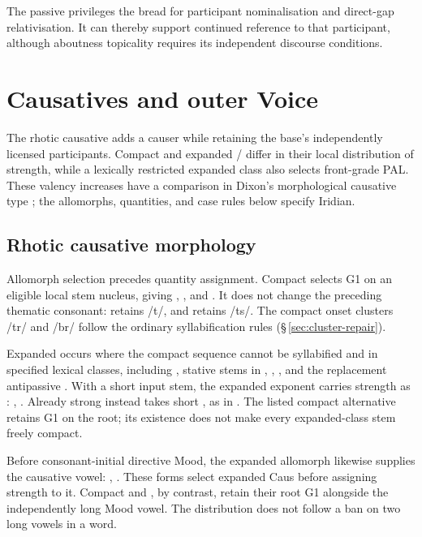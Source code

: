 The passive privileges the bread for
participant nominalisation and direct-gap relativisation. It can thereby
support continued reference to that participant, although aboutness topicality
requires its independent discourse conditions.


\section{Causatives and outer Voice}\label{sec:aspect-caus}

The rhotic causative adds a causer while retaining the base's independently
licensed participants. Compact  and expanded /
differ in their local distribution of strength, while a lexically restricted
expanded class also selects front-grade PAL. These valency increases have a
comparison in Dixon's morphological causative type \cite{dixon2000};
the allomorphs, quantities, and case rules below specify Iridian.

\subsection{Rhotic causative morphology}
\label{sec:causative-grades}

Allomorph selection precedes quantity assignment. Compact 
selects G1 on an eligible local stem nucleus, giving ,
, and . It does not change the preceding
thematic consonant:  retains /t/, and
 retains /ts/. The compact onset clusters /tr/ and /br/
follow the ordinary syllabification rules
(§\,\ref{sec:cluster-repair}).

Expanded  occurs where the compact sequence cannot be
syllabified and in specified lexical classes, including ,
stative stems in , , , and the
replacement antipassive . With a short input stem, the
expanded exponent carries strength as :
, . Already strong 
instead takes short , as in .
The listed compact alternative  retains G1 on the root;
its existence does not make every expanded-class stem freely compact.

Before consonant-initial directive Mood, the expanded allomorph likewise
supplies the causative vowel: , .
These forms select expanded Caus before assigning strength to it.
Compact  and , by contrast, retain
their root G1 alongside the independently long Mood vowel. The distribution
does not follow a ban on two long vowels in a word.

